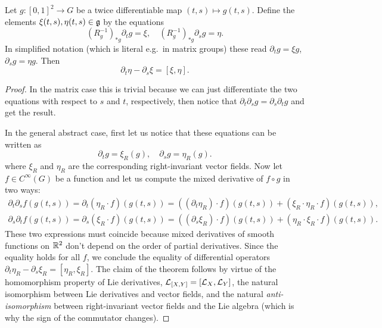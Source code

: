 \begin{prop}
    Let $g:[0,1]^2\to G$ be a twice differentiable map $(t,s)\mapsto g(t,s)$. Define the elements $\xi(t,s),\eta(t,s)\in\mathfrak{g}$ by the equations
    \[(R_{g}^{-1})_{\ast g}\partial_t g=\xi, \quad (R_{g}^{-1})_{\ast g}\partial_s g=\eta.\]
    In simplified notation (which is literal e.g.~in matrix groups) these read $\partial_t g=\xi g$, $\partial_s g=\eta g$. Then 
    \[\partial_t \eta-\partial_s \xi =[\xi,\eta].\label{eq Maurer-Cartan}\]
\end{prop}
\begin{proof}
    In the matrix case this is trivial because we can just differentiate the two equations with respect to $s$ and $t$, respectively, then notice that $\partial_t\partial_s g=\partial_s\partial_t g$ and get the result.

    In the general abstract case, first let us notice that these equations can be written as
    \[\partial_t g=\xi_R(g),\quad \partial_s g=\eta_R(g).\]
    where $\xi_R$ and $\eta_R$ are the corresponding right-invariant vector fields. Now let $f\in C^\infty(G)$ be a function and let us compute the mixed derivative of $f\circ g$ in two ways:
    \begin{gather}
        \partial_t\partial_s f(g(t,s))=\partial_t (\eta_R\cdot f)(g(t,s))=((\partial_t\eta_R)\cdot f)(g(t,s))+(\xi_R\cdot \eta_R\cdot f)(g(t,s)),\\
        \partial_s\partial_t f(g(t,s))=\partial_s (\xi_R\cdot f)(g(t,s))=((\partial_s\xi_R)\cdot f)(g(t,s))+(\eta_R\cdot \xi_R\cdot f)(g(t,s)).
    \end{gather}
    These two expressions must coincide because mixed derivatives of smooth functions on $\mathbb{R}^2$ don't depend on the order of partial derivatives. Since the equality holds for all $f$, we conclude the equality of differential operators $\partial_t\eta_R-\partial_s\xi_R=[\eta_R,\xi_R]$. The claim of the theorem follows by virtue of the homomorphism property of Lie derivatives, $\mathcal{L}_{[X,Y]}=[\mathcal{L}_X,\mathcal{L}_Y]$, the natural isomorphism between Lie derivatives and vector fields, and the natural \emph{anti-isomorphism} between right-invariant vector fields and the Lie algebra (which is why the sign of the commutator changes).
\end{proof}

